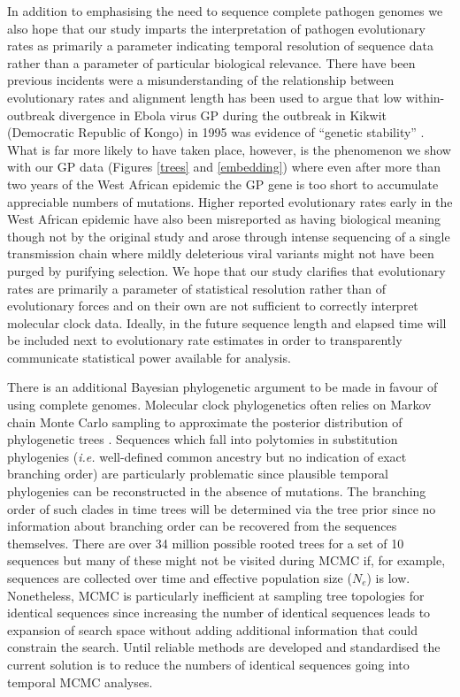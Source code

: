 \documentclass{bmcart}
\begin{document}
In addition to emphasising the need to sequence complete pathogen genomes we also hope that our study imparts the interpretation of pathogen evolutionary rates as primarily a parameter indicating temporal resolution of sequence data rather than a parameter of particular biological relevance.
There have been previous incidents were a misunderstanding of the relationship between evolutionary rates and alignment length has been used to argue that low within-outbreak divergence in Ebola virus GP during the outbreak in Kikwit (Democratic Republic of Kongo) in 1995 was evidence of ``genetic stability'' \cite{rodriguez_persistence_1999}.
What is far more likely to have taken place, however, is the phenomenon we show with our GP data (Figures \ref{trees} and \ref{embedding}) where even after more than two years of the West African epidemic the GP gene is too short to accumulate appreciable numbers of mutations.
Higher reported evolutionary rates early in the West African epidemic \cite{gire_genomic_2014} have also been misreported as having biological meaning though not by the original study \cite{holmes_evolution_2016,rambaut_comment_2016} and arose through intense sequencing of a single transmission chain where mildly deleterious viral variants might not have been purged by purifying selection.
We hope that our study clarifies that evolutionary rates are primarily a parameter of statistical resolution rather than of evolutionary forces and on their own are not sufficient to correctly interpret molecular clock data.
Ideally, in the future sequence length and elapsed time will be included next to evolutionary rate estimates in order to transparently communicate statistical power available for analysis.

There is an additional Bayesian phylogenetic argument to be made in favour of using complete genomes.
Molecular clock phylogenetics often relies on Markov chain Monte Carlo sampling to approximate the posterior distribution of phylogenetic trees \cite{yang_bayesian_1997}.
Sequences which fall into polytomies in substitution phylogenies (\textit{i.e.} well-defined common ancestry but no indication of exact branching order) are particularly problematic since plausible temporal phylogenies can be reconstructed in the absence of mutations.
The branching order of such clades in time trees will be determined via the tree prior since no information about branching order can be recovered from the sequences themselves.
There are over 34 million possible rooted trees for a set of 10 sequences but many of these might not be visited during MCMC if, for example, sequences are collected over time and effective population size ($N_{e}$) is low.
Nonetheless, MCMC is particularly inefficient at sampling tree topologies for identical sequences \cite{whidden_quantifying_2015} since increasing the number of identical sequences leads to expansion of search space without adding additional information that could constrain the search.
Until reliable methods are developed and standardised the current solution is to reduce the numbers of identical sequences going into temporal MCMC analyses.
\end{document}
